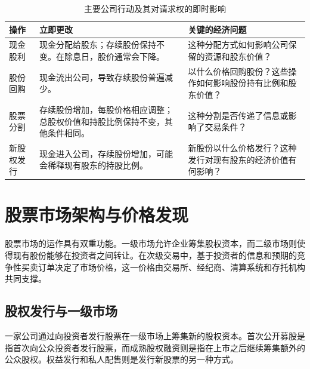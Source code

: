 \begin{table}[H]
\centering

\caption{主要公司行动及其对请求权的即时影响}
\label{tab:ch9-corporate-actions}

\begin{tabularx}{\textwidth}{@{}p{2.8cm}Y Y@{}}

\toprule

\textbf{操作}
& \textbf{立即更改}
& \textbf{关键的经济问题} \\

\midrule

现金股利
& 现金分配给股东；存续股份保持不变。在除息日，股价通常会下降。
& 这种分配方式如何影响公司保留的资源和股东价值？\\

股份回购  
& 现金流出公司，导致存续股份普遍减少。  
& 以什么价格回购股份？这些操作如何影响股份持有比例和股东价值？\\

股票分割
& 存续股份增加，每股价格相应调整；总股权价值和持股比例保持不变，其他条件相同。
& 这种分割是否传递了信息或影响了交易条件？\\

新股权发行  
& 现金进入公司，存续股份增加，可能会稀释现有股东的持股比例。  
& 新股份以什么价格发行？这种发行对现有股东的经济价值有何影响？\\

\bottomrule

\end{tabularx}

\end{table}

\section{股票市场架构与价格发现}

股票市场的运作具有双重功能。一级市场允许企业筹集股权资本，而二级市场则使得现有股份能够在投资者之间转让。在次级交易中，基于投资者的信息和预期的竞争性买卖订单决定了市场价格，这一价格由交易所、经纪商、清算系统和存托机构共同支撑。

\subsection{股权发行与一级市场}

一家公司通过向投资者发行股票在一级市场上筹集新的股权资本。首次公开募股是指首次向公众投资者发行股票，而成熟股权融资则是指在上市之后继续筹集额外的公众股权。权益发行和私人配售则是发行新股票的另一种方式。

